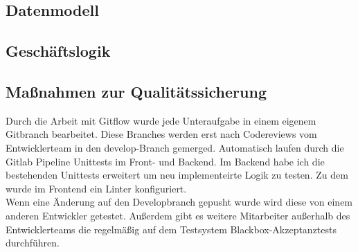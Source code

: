\subsection{Datenmodell}
\label{datenmodell}

\subsection{Geschäftslogik}
\label{geschaeftslogik}

\subsection{Maßnahmen zur Qualitätssicherung}
\label{qualitaetssicherung}
Durch die Arbeit mit Gitflow wurde jede Unteraufgabe in einem eigenem Gitbranch bearbeitet. Diese Branches werden erst nach Codereviews vom Entwicklerteam in den develop-Branch gemerged.  Automatisch laufen durch die Gitlab Pipeline Unittests im Front- und Backend. Im Backend habe ich die bestehenden Unittests erweitert um neu implementeirte Logik zu testen. Zu dem wurde im Frontend ein \gls{Linter} konfiguriert.\\
Wenn eine Änderung auf den Developbranch gepusht wurde wird diese von einem anderen Entwickler getestet. Außerdem gibt es weitere Mitarbeiter außerhalb des Entwicklerteams die regelmäßig auf dem Testsystem Blackbox-Akzeptanztests durchführen.